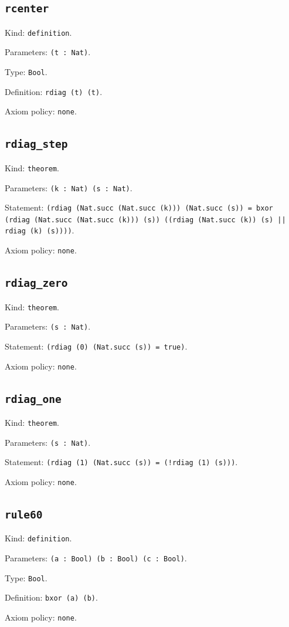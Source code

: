 \documentclass[11pt]{article}
\begin{document}
\subsection*{\texttt{rcenter}}
\noindent Kind: \texttt{definition}.\par
\noindent Parameters: \texttt{(t : Nat)}.\par
\noindent Type: \texttt{Bool}.\par
\noindent Definition: \texttt{rdiag (t) (t)}.\par
\noindent Axiom policy: \texttt{none}.\par
\subsection*{\texttt{rdiag\_step}}
\noindent Kind: \texttt{theorem}.\par
\noindent Parameters: \texttt{(k : Nat) (s : Nat)}.\par
\noindent Statement: \texttt{(rdiag (Nat.succ (Nat.succ (k))) (Nat.succ (s)) = bxor (rdiag (Nat.succ (Nat.succ (k))) (s)) ((rdiag (Nat.succ (k)) (s) || rdiag (k) (s))))}.\par
\noindent Axiom policy: \texttt{none}.\par
\subsection*{\texttt{rdiag\_zero}}
\noindent Kind: \texttt{theorem}.\par
\noindent Parameters: \texttt{(s : Nat)}.\par
\noindent Statement: \texttt{(rdiag (0) (Nat.succ (s)) = true)}.\par
\noindent Axiom policy: \texttt{none}.\par
\subsection*{\texttt{rdiag\_one}}
\noindent Kind: \texttt{theorem}.\par
\noindent Parameters: \texttt{(s : Nat)}.\par
\noindent Statement: \texttt{(rdiag (1) (Nat.succ (s)) = (!rdiag (1) (s)))}.\par
\noindent Axiom policy: \texttt{none}.\par
\subsection*{\texttt{rule60}}
\noindent Kind: \texttt{definition}.\par
\noindent Parameters: \texttt{(a : Bool) (b : Bool) (c : Bool)}.\par
\noindent Type: \texttt{Bool}.\par
\noindent Definition: \texttt{bxor (a) (b)}.\par
\noindent Axiom policy: \texttt{none}.\par
\end{document}
